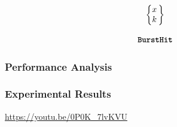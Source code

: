 \begin{frame}
    \vspace{1cm}

    \large
    \begin{equation*}
        \begin{matrix}
            \left\{\begin{matrix}
                x \\
                k
            \end{matrix}\,\right\} \\
                                 \\
            \texttt{\textbf{BurstHit}}
        \end{matrix}
    \end{equation*}
\end{frame}


\begin{frame}
    \frametitle{Performance Analysis}
    \begin{minipage}[c]{0.09\textwidth}
        \vspace{0.9cm}
    \end{minipage}
    \begin{minipage}[c]{0.89\textwidth}
        \begin{figure}[h]
            \centering
            
        \end{figure}
    \end{minipage}
\end{frame}




\begin{frame}
    \frametitle{Experimental Results}
    \centering
    \LARGE
    \textcolor{hicolour}{\url{https://youtu.be/0P0K_7lvKVU}}
\end{frame}
